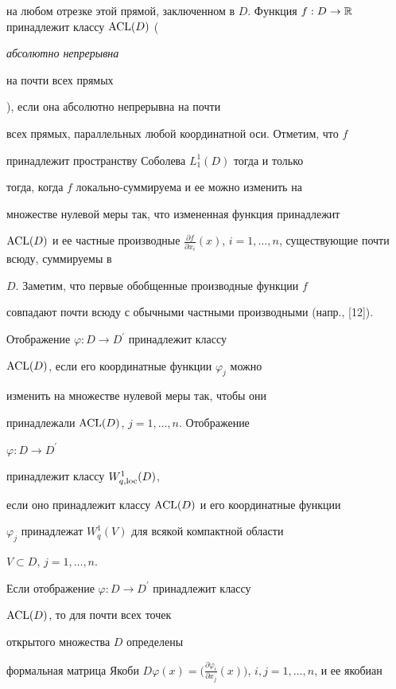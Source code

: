 на любом отрезке этой прямой, заключенном в $D$. Функция $f:D\to


{\Bbb R}$ принадлежит классу $\ACL(D)$ ({\it абсолютно непрерывна


на почти всех прямых}), если она абсолютно непрерывна на почти


всех прямых, параллельных любой координатной оси. Отметим, что $f$


принадлежит пространству Соболева $L^1_{1}(D)$ тогда и только


тогда, когда $f$ локально-суммируема и ее можно изменить на


множестве нулевой меры так, что измененная функция принадлежит


$\ACL(D)$ и ее частные производные $\frac{\partial f}{\partial


x_i}(x)$, $i=1,\dotsc,n$, существующие почти всюду, суммируемы в


$D$. Заметим, что первые обобщенные производные функции $f$


совпадают почти всюду с обычными частными производными (напр., [12]).





Отображение $\varphi:D\to D^{\prime}$ принадлежит классу


$\operatorname{ACL}(D)$, если его координатные функции $\varphi_j$ можно


изменить на множестве нулевой меры так, чтобы они


принадлежали $\operatorname{ACL}(D)$, $j=1,\dotsc,n$. Отображение


$\varphi:D\to D^{\prime}$


принадлежит классу $W^1_{q,\operatorname{loc}}(D)$,


если оно принадлежит классу $\operatorname{ACL}(D)$ и его координатные функции


$\varphi_j$ принадлежат $W^1_{q}(V)$ для всякой компактной области


$V\subset D$, $j=1,\dotsc,n$.





Если отображение $\varphi:D\to D^{\prime}$ принадлежит классу


$\operatorname{ACL}(D)$, то для почти всех точек


открытого множества $D$ определены


формальная матрица Якоби $D\varphi(x)=\big(\frac{\partial


\varphi_i}{\partial x_j}(x)\big)$, $i,j=1,\dotsc,n$, и ее якобиан


